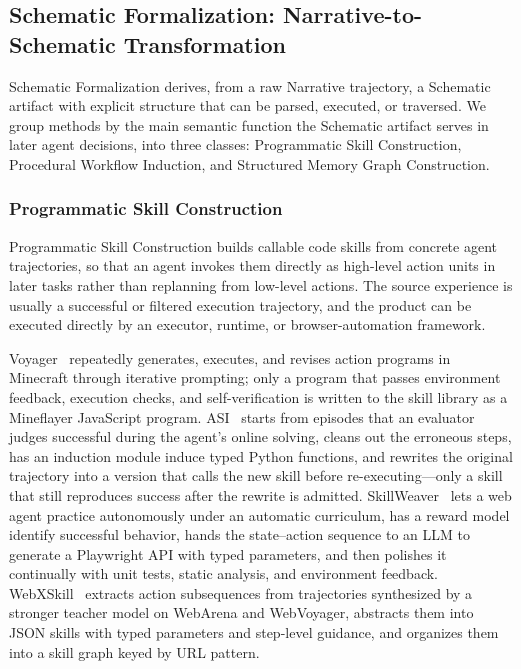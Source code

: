 \subsection{Schematic Formalization: Narrative-to-Schematic Transformation}
\label{sec:schematic-formalization}

Schematic Formalization derives, from a raw Narrative trajectory, a Schematic artifact with explicit structure that can be parsed, executed, or traversed. We group methods by the main semantic function the Schematic artifact serves in later agent decisions, into three classes: Programmatic Skill Construction, Procedural Workflow Induction, and Structured Memory Graph Construction.

\subsubsection{Programmatic Skill Construction}

Programmatic Skill Construction builds callable code skills from concrete agent trajectories, so that an agent invokes them directly as high-level action units in later tasks rather than replanning from low-level actions. The source experience is usually a successful or filtered execution trajectory, and the product can be executed directly by an executor, runtime, or browser-automation framework.

Voyager~\cite{Wan23c} repeatedly generates, executes, and revises action programs in Minecraft through iterative prompting; only a program that passes environment feedback, execution checks, and self-verification is written to the skill library as a Mineflayer JavaScript program. ASI~\cite{Wan25d} starts from episodes that an evaluator judges successful during the agent's online solving, cleans out the erroneous steps, has an induction module induce typed Python functions, and rewrites the original trajectory into a version that calls the new skill before re-executing---only a skill that still reproduces success after the rewrite is admitted. SkillWeaver~\cite{Zhe25c} lets a web agent practice autonomously under an automatic curriculum, has a reward model identify successful behavior, hands the state--action sequence to an LLM to generate a Playwright API with typed parameters, and then polishes it continually with unit tests, static analysis, and environment feedback. WebXSkill~\cite{Wan26d} extracts action subsequences from trajectories synthesized by a stronger teacher model on WebArena and WebVoyager, abstracts them into JSON skills with typed parameters and step-level guidance, and organizes them into a skill graph keyed by URL pattern.

